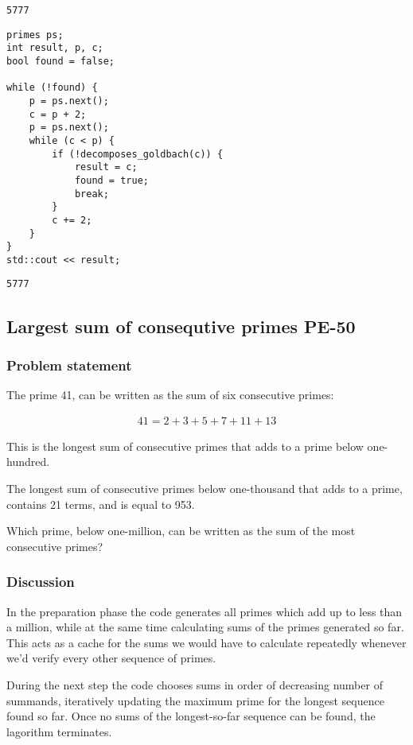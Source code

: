 \documentclass[11pt]{article}
\begin{document}
\begin{verbatim}
5777
\end{verbatim}

\begin{verbatim}
primes ps;
int result, p, c;
bool found = false;

while (!found) {
    p = ps.next();
    c = p + 2;
    p = ps.next();
    while (c < p) {
        if (!decomposes_goldbach(c)) {
            result = c;
            found = true;
            break;
        }
        c += 2;
    }
}
std::cout << result;
\end{verbatim}

\begin{verbatim}
5777
\end{verbatim}

\subsection{Largest sum of consequtive primes PE-50}
\label{sec:orgheadline13}
\subsubsection{Problem statement}
\label{sec:orgheadline10}
The prime 41, can be written as the sum of six consecutive primes:

\begin{align*}
  41 = 2 + 3 + 5 + 7 + 11 + 13
\end{align*}

This is the longest sum of consecutive primes that adds to a prime
below one-hundred.

The longest sum of consecutive primes below one-thousand that adds
to a prime, contains 21 terms, and is equal to 953.

Which prime, below one-million, can be written as the sum of the
most consecutive primes?

\subsubsection{Discussion}
\label{sec:orgheadline11}
In the preparation phase the code generates all primes which add up to less
than a million, while at the same time calculating sums of the primes
generated so far.  This acts as a cache for the sums we would have to
calculate repeatedly whenever we'd verify every other sequence of primes.

During the next step the code chooses sums in order of decreasing number of
summands, iteratively updating the maximum prime for the longest sequence
found so far.  Once no sums of the longest-so-far sequence can be found,
the lagorithm terminates.
\end{document}
